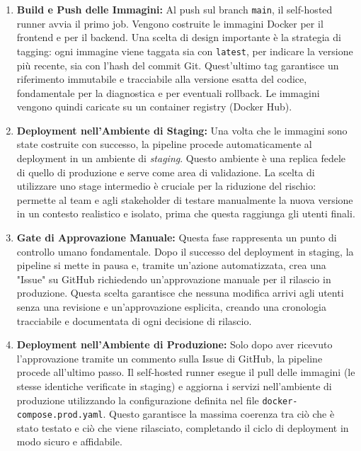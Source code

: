 \documentclass[12pt,a4paper,openright,twoside]{book}
\begin{document}
\begin{enumerate}
    \item \textbf{Build e Push delle Immagini:} Al push sul branch \texttt{main}, il self-hosted runner avvia il primo job. Vengono costruite le immagini Docker per il frontend e per il backend. Una scelta di design importante è la strategia di tagging: ogni immagine viene taggata sia con \texttt{latest}, per indicare la versione più recente, sia con l'hash del commit Git. Quest'ultimo tag garantisce un riferimento immutabile e tracciabile alla versione esatta del codice, fondamentale per la diagnostica e per eventuali rollback. Le immagini vengono quindi caricate su un container registry (Docker Hub).

    \item \textbf{Deployment nell'Ambiente di Staging:} Una volta che le immagini sono state costruite con successo, la pipeline procede automaticamente al deployment in un ambiente di \textit{staging}. Questo ambiente è una replica fedele di quello di produzione e serve come area di validazione. La scelta di utilizzare uno stage intermedio è cruciale per la riduzione del rischio: permette al team e agli stakeholder di testare manualmente la nuova versione in un contesto realistico e isolato, prima che questa raggiunga gli utenti finali.

    \item \textbf{Gate di Approvazione Manuale:} Questa fase rappresenta un punto di controllo umano fondamentale. Dopo il successo del deployment in staging, la pipeline si mette in pausa e, tramite un'azione automatizzata, crea una "Issue" su GitHub richiedendo un'approvazione manuale per il rilascio in produzione. Questa scelta garantisce che nessuna modifica arrivi agli utenti senza una revisione e un'approvazione esplicita, creando una cronologia tracciabile e documentata di ogni decisione di rilascio.

    \item \textbf{Deployment nell'Ambiente di Produzione:} Solo dopo aver ricevuto l'approvazione tramite un commento sulla Issue di GitHub, la pipeline procede all'ultimo passo. Il self-hosted runner esegue il pull delle immagini (le stesse identiche verificate in staging) e aggiorna i servizi nell'ambiente di produzione utilizzando la configurazione definita nel file \texttt{docker-compose.prod.yaml}. Questo garantisce la massima coerenza tra ciò che è stato testato e ciò che viene rilasciato, completando il ciclo di deployment in modo sicuro e affidabile.
\end{enumerate}
\end{document}
